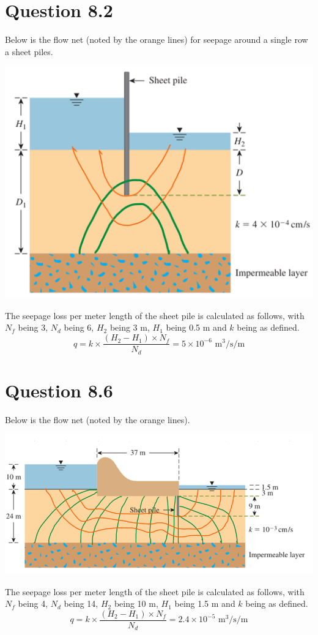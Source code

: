 \documentclass{article}
\begin{document}
\section*{Question 8.2}
Below is the flow net (noted by the orange lines) for seepage around a single row a sheet piles.
\begin{center}
\includegraphics*[scale=0.7]{fig1.png}
\end{center}
The seepage loss per meter length of the sheet pile is calculated as follows, with $N_f$ being 3, $N_d$ being 6, $H_2$ being 3 m, $H_1$ being 0.5 m and $k$ being as defined. 
\[q=k\times\frac{(H_2-H_1)\times N_f}{N_d}=\boxed{5\times 10^{-6}\text{ m}^3\text{/s/m}}\]
\section*{Question 8.6}
Below is the flow net (noted by the orange lines).
\begin{center}
    \includegraphics*[scale=0.5]{fig2.png}
\end{center}
The seepage loss per meter length of the sheet pile is calculated as follows, with $N_f$ being 4, $N_d$ being 14, $H_2$ being 10 m, $H_1$ being 1.5 m and $k$ being as defined. 
\[q=k\times\frac{(H_2-H_1)\times N_f}{N_d}=\boxed{2.4\times 10^{-5}\text{ m}^3\text{/s/m}}\]
\newpage
\end{document}
